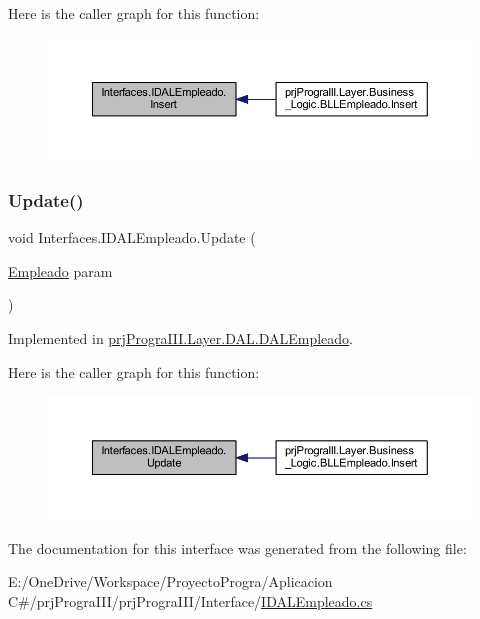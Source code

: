Here is the caller graph for this function\+:
\nopagebreak
\begin{figure}[H]
\begin{center}
\leavevmode
\includegraphics[width=350pt]{interface_interfaces_1_1_i_d_a_l_empleado_ad9609df99d0b1ad098a61ea27d700393_icgraph}
\end{center}
\end{figure}
\hypertarget{interface_interfaces_1_1_i_d_a_l_empleado_a3e979162d517e91994750b5efc6451d9}{}\label{interface_interfaces_1_1_i_d_a_l_empleado_a3e979162d517e91994750b5efc6451d9} 
\subsubsection{\texorpdfstring{Update()}{Update()}}
{\footnotesize\ttfamily void Interfaces.\+I\+D\+A\+L\+Empleado.\+Update (\begin{DoxyParamCaption}\item[{\hyperlink{classprj_progra_i_i_i_1_1_layer_1_1_entities_1_1_empleado}{Empleado}}]{param }\end{DoxyParamCaption})}



Implemented in \hyperlink{classprj_progra_i_i_i_1_1_layer_1_1_d_a_l_1_1_d_a_l_empleado_ab97689057c451afa71447c434bbac131}{prj\+Progra\+I\+I\+I.\+Layer.\+D\+A\+L.\+D\+A\+L\+Empleado}.

Here is the caller graph for this function\+:
\nopagebreak
\begin{figure}[H]
\begin{center}
\leavevmode
\includegraphics[width=350pt]{interface_interfaces_1_1_i_d_a_l_empleado_a3e979162d517e91994750b5efc6451d9_icgraph}
\end{center}
\end{figure}


The documentation for this interface was generated from the following file\+:\begin{DoxyCompactItemize}
\item 
E\+:/\+One\+Drive/\+Workspace/\+Proyecto\+Progra/\+Aplicacion C\#/prj\+Progra\+I\+I\+I/prj\+Progra\+I\+I\+I/\+Interface/\hyperlink{_i_d_a_l_empleado_8cs}{I\+D\+A\+L\+Empleado.\+cs}\end{DoxyCompactItemize}
